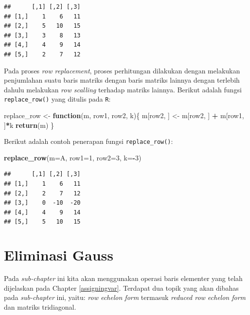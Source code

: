 \documentclass[
]{book}
\newenvironment{Shaded}{\begin{snugshade}}{\end{snugshade}}
\newcommand{\AttributeTok}[1]{\textcolor[rgb]{0.13,0.29,0.53}{#1}}
\newcommand{\ControlFlowTok}[1]{\textcolor[rgb]{0.13,0.29,0.53}{\textbf{#1}}}
\newcommand{\DecValTok}[1]{\textcolor[rgb]{0.00,0.00,0.81}{#1}}
\newcommand{\FunctionTok}[1]{\textcolor[rgb]{0.13,0.29,0.53}{\textbf{#1}}}
\newcommand{\NormalTok}[1]{#1}
\newcommand{\OtherTok}[1]{\textcolor[rgb]{0.56,0.35,0.01}{#1}}
\newcommand{\SpecialCharTok}[1]{\textcolor[rgb]{0.81,0.36,0.00}{\textbf{#1}}}
\theoremstyle{definition}
\theoremstyle{definition}
\theoremstyle{definition}
\theoremstyle{definition}
\theoremstyle{remark}
\begin{document}
\begin{verbatim}
##      [,1] [,2] [,3]
## [1,]    1    6   11
## [2,]    5   10   15
## [3,]    3    8   13
## [4,]    4    9   14
## [5,]    2    7   12
\end{verbatim}

Pada proses \emph{row replacement}, proses perhitungan dilakukan dengan melakukan penjumlahan suatu baris matriks dengan baris matriks lainnya dengan terlebih dahulu melakukan \emph{row scalling} terhadap matriks lainnya. Berikut adalah fungsi \texttt{replace\_row()} yang ditulis pada \texttt{R}:

\begin{Shaded}
\begin{Highlighting}[]
\NormalTok{replace\_row }\OtherTok{\textless{}{-}} \ControlFlowTok{function}\NormalTok{(m, row1, row2, k)\{}
\NormalTok{  m[row2, ] }\OtherTok{\textless{}{-}}\NormalTok{ m[row2, ] }\SpecialCharTok{+}\NormalTok{ m[row1, ]}\SpecialCharTok{*}\NormalTok{k}
  \FunctionTok{return}\NormalTok{(m)}
\NormalTok{\}}
\end{Highlighting}
\end{Shaded}

Berikut adalah contoh penerapan fungsi \texttt{replace\_row()}:

\begin{Shaded}
\begin{Highlighting}[]
\FunctionTok{replace\_row}\NormalTok{(}\AttributeTok{m=}\NormalTok{A, }\AttributeTok{row1=}\DecValTok{1}\NormalTok{, }\AttributeTok{row2=}\DecValTok{3}\NormalTok{, }\AttributeTok{k=}\SpecialCharTok{{-}}\DecValTok{3}\NormalTok{)}
\end{Highlighting}
\end{Shaded}

\begin{verbatim}
##      [,1] [,2] [,3]
## [1,]    1    6   11
## [2,]    2    7   12
## [3,]    0  -10  -20
## [4,]    4    9   14
## [5,]    5   10   15
\end{verbatim}

\hypertarget{gausselimination}{%
\section{Eliminasi Gauss}\label{gausselimination}}

Pada \emph{sub-chapter} ini kita akan menggunakan operasi baris elementer yang telah dijelaskan pada Chapter \ref{assigningvar}. Terdapat dua topik yang akan dibahas pada \emph{sub-chapter} ini, yaitu: \emph{row echelon form} termasuk \emph{reduced row echelon form} dan matriks tridiagonal.
\end{document}
